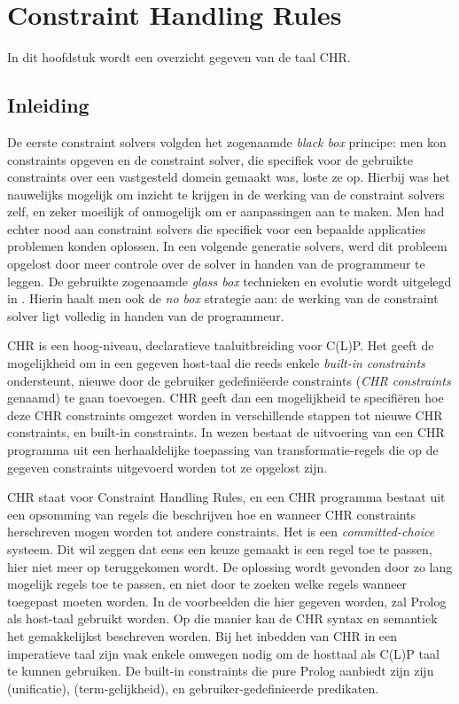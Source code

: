 \chapter{Constraint Handling Rules}

In dit hoofdstuk wordt een overzicht gegeven van de taal CHR.

\section{Inleiding}

De eerste constraint solvers volgden het zogenaamde {\em black box} principe: men kon constraints opgeven en de constraint solver, die specifiek voor de gebruikte constraints over een vastgesteld domein gemaakt was, loste ze op. Hierbij was het nauwelijks mogelijk om inzicht te krijgen in de werking van de constraint solvers zelf, en zeker moeilijk of onmogelijk om er aanpassingen aan te maken. Men had echter nood aan constraint solvers die specifiek voor een bepaalde applicaties problemen konden oplossen. In een volgende generatie solvers, werd dit probleem opgelost door meer controle over de solver in handen van de programmeur te leggen. De gebruikte zogenaamde  {\em glass box} technieken en evolutie wordt uitgelegd in \cite{chr}. Hierin haalt men ook de {\em no box} strategie aan: de werking van de constraint solver ligt volledig in handen van de programmeur.

CHR is een hoog-niveau, declaratieve taaluitbreiding voor C(L)P. Het geeft de mogelijkheid om in een gegeven host-taal die reeds enkele {\em built-in constraints} ondersteunt, nieuwe door de gebruiker gedefini\"eerde constraints ({\em CHR constraints} genaamd) te gaan toevoegen. CHR geeft dan een mogelijkheid te specifi\"eren hoe deze CHR constraints omgezet worden in verschillende stappen tot nieuwe CHR constraints, en built-in constraints. In wezen bestaat de uitvoering van een CHR programma uit een herhaaldelijke toepassing van transformatie-regels die op de gegeven constraints uitgevoerd worden tot ze opgelost zijn.

CHR staat voor Constraint Handling Rules, en een CHR programma bestaat uit een opsomming van regels die beschrijven hoe en wanneer CHR constraints herschreven mogen worden tot andere constraints. Het is een {\em committed-choice} systeem. Dit wil zeggen dat eens een keuze gemaakt is een regel toe te passen, hier niet meer op teruggekomen wordt. De oplossing wordt gevonden door zo lang mogelijk regels toe te passen, en niet door te zoeken welke regels wanneer toegepast moeten worden. In de voorbeelden die hier gegeven worden, zal Prolog als host-taal gebruikt worden. Op die manier kan de CHR syntax en semantiek het gemakkelijkst beschreven worden. Bij het inbedden van CHR in een imperatieve taal zijn vaak enkele omwegen nodig om de hosttaal als C(L)P taal te kunnen gebruiken. De built-in constraints die pure Prolog aanbiedt zijn zijn \code{=} (unificatie), \code{==} (term-gelijkheid), en gebruiker-gedefinieerde predikaten.

